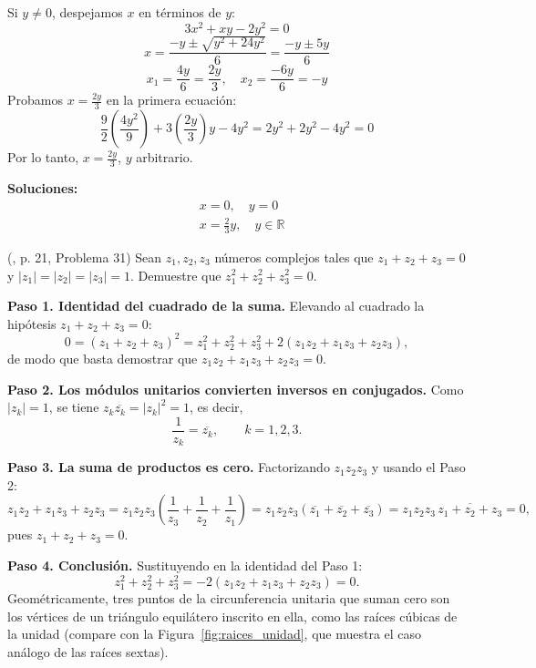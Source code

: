 \begin{prob}
\begin{myproof}
Si $y \neq 0$, despejamos $x$ en términos de $y$:
\[
3x^2 + xy - 2y^2 = 0
\]
\[
x = \frac{-y \pm \sqrt{y^2 + 24y^2}}{6} = \frac{-y \pm 5y}{6}
\]
\[
x_1 = \frac{4y}{6} = \frac{2y}{3}, \quad x_2 = \frac{-6y}{6} = -y
\]
Probamos $x = \frac{2y}{3}$ en la primera ecuación:
\[
\frac{9}{2}\left(\frac{4y^2}{9}\right) + 3\left(\frac{2y}{3}\right)y - 4y^2 = 2y^2 + 2y^2 - 4y^2 = 0
\]
Por lo tanto, $x = \frac{2y}{3}$, $y$ arbitrario.

\textbf{Soluciones:}
\[
\boxed{
\begin{aligned}
&x = 0,\quad y = 0 \\
&x = \frac{2}{3}y,\quad y\in\mathbb{R}
\end{aligned}
}
\]
\end{myproof}
\end{prob}

\begin{prob} (\cite{andreescu2014complex}, p. 21, Problema 31) Sean $z_1, z_2, z_3$ números complejos tales que $z_1+z_2+z_3=0$ y $|z_1|=|z_2|=|z_3|=1$. Demuestre que $z_1^2+z_2^2+z_3^2=0$.
\begin{myproof}
\textbf{Paso 1. Identidad del cuadrado de la suma.} Elevando al cuadrado la hipótesis $z_1 + z_2 + z_3 = 0$:
\[
0=(z_1+z_2+z_3)^2=z_1^2+z_2^2+z_3^2+2(z_1z_2+z_1z_3+z_2z_3),
\]
de modo que basta demostrar que $z_1z_2+z_1z_3+z_2z_3=0$.

\textbf{Paso 2. Los módulos unitarios convierten inversos en conjugados.} Como $|z_k|=1$, se tiene $z_k\overline{z_k}=|z_k|^2=1$, es decir,
\[
\dfrac{1}{z_k}=\overline{z_k},\qquad k=1,2,3.
\]

\textbf{Paso 3. La suma de productos es cero.} Factorizando $z_1z_2z_3$ y usando el Paso 2:
\[
z_1z_2+z_1z_3+z_2z_3=z_1z_2z_3\left(\frac{1}{z_3}+\frac{1}{z_2}+\frac{1}{z_1}\right)=z_1z_2z_3\left(\overline{z_1}+\overline{z_2}+\overline{z_3}\right)=z_1z_2z_3\,\overline{z_1+z_2+z_3}=0,
\]
pues $z_1+z_2+z_3=0$.

\textbf{Paso 4. Conclusión.} Sustituyendo en la identidad del Paso 1:
\[
\boxed{z_1^2+z_2^2+z_3^2=-2(z_1z_2+z_1z_3+z_2z_3)=0.}
\]
Geométricamente, tres puntos de la circunferencia unitaria que suman cero son los vértices de un triángulo equilátero inscrito en ella, como las raíces cúbicas de la unidad (compare con la Figura~\ref{fig:raices_unidad}, que muestra el caso análogo de las raíces sextas).
\end{myproof}
\end{prob}

